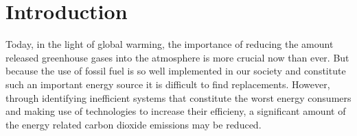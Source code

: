 \section{Introduction}
Today, in the light of global warming, the importance of reducing the amount released
greenhouse gases into the atmosphere is more crucial now than ever. But because the use of
fossil fuel is so well implemented in our society and constitute such an important energy source
it is difficult to find replacements. However, through identifying inefficient systems
that constitute the worst energy consumers and making use of technologies to increase their efficieny,
a significant amount of the energy related carbon dioxide emissions may be reduced.
%

